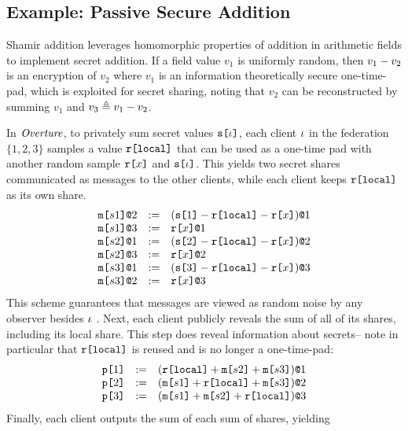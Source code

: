 \subsection{Example: Passive Secure Addition}
\label{section-lang-example}

Shamir addition leverages homomorphic properties of addition in
arithmetic fields to implement secret addition. If a field value $v_1$
is uniformly random, then $v_1 - v_2$ is an encryption of $v_2$
where $v_1$ is an information theoretically secure one-time-pad, which
is exploited for secret sharing, noting that $v_2$ can be
reconstructed by summing $v_1$ and $v_3 \triangleq v_1 - v_2$. 

In $\mathit{Overture}$, to privately sum secret values $\texttt{s[}\iota\texttt{]}$, each
client $\iota$ in the federation $\{ 1, 2, 3 \}$ samples a value
$\texttt{r[}\mathtt{local}\texttt{]}$ that can be used as a one-time pad with another random
sample $\texttt{r[}x\texttt{]}$ and $\texttt{s[}\iota\texttt{]}$. This yields two secret shares
communicated as messages to the other clients, while each client keeps
$\texttt{r[}\mathtt{local}\texttt{]}$ as its own share.
$$
\begin{array}{lll}
  \texttt{m[}s1\texttt{]}\texttt{@}2 &:=& (\texttt{s[}1\texttt{]} - \texttt{r[}\mathtt{local}\texttt{]} - \texttt{r[}x\texttt{]})\texttt{@}1 \\ 
  \texttt{m[}s1\texttt{]}\texttt{@}3 &:=& \texttt{r[}x\texttt{]}\texttt{@}1 \\ 
  \texttt{m[}s2\texttt{]}\texttt{@}1 &:=& (\texttt{s[}2\texttt{]} - \texttt{r[}\mathtt{local}\texttt{]} - \texttt{r[}x\texttt{]})\texttt{@}2 \\ 
  \texttt{m[}s2\texttt{]}\texttt{@}3 &:=& \texttt{r[}x\texttt{]}\texttt{@}2 \\ 
  \texttt{m[}s3\texttt{]}\texttt{@}1 &:=& (\texttt{s[}3\texttt{]} - \texttt{r[}\mathtt{local}\texttt{]} - \texttt{r[}x\texttt{]})\texttt{@}3 \\ 
  \texttt{m[}s3\texttt{]}\texttt{@}2 &:=& \texttt{r[}x\texttt{]}\texttt{@}3
\end{array}
$$
This scheme guarantees that messages
are viewed as random noise by any observer 
besides $\iota$ \cite{barthe2019probabilistic}. Next, each client
publicly reveals the sum of all of its shares, including its local
share. This step does reveal information about secrets-- note in
particular that $\texttt{r[}\mathtt{local}\texttt{]}$ is reused and is no longer a one-time-pad:
$$
\begin{array}{lll}
  \texttt{p[}1\texttt{]} &:=& (\texttt{r[}\mathtt{local}\texttt{]} + \texttt{m[}s2\texttt{]} + \texttt{m[}s3\texttt{]})\texttt{@}1 \\ 
  \texttt{p[}2\texttt{]} &:=& (\texttt{m[}s1\texttt{]} + \texttt{r[}\mathtt{local}\texttt{]} + \texttt{m[}s3\texttt{]})\texttt{@}2 \\
  \texttt{p[}3\texttt{]} &:=& (\texttt{m[}s1\texttt{]} + \texttt{m[}s2\texttt{]} + \texttt{r[}\mathtt{local}\texttt{]})\texttt{@}3 
\end{array}
$$
Finally, each client outputs the sum of each sum of shares, yielding
